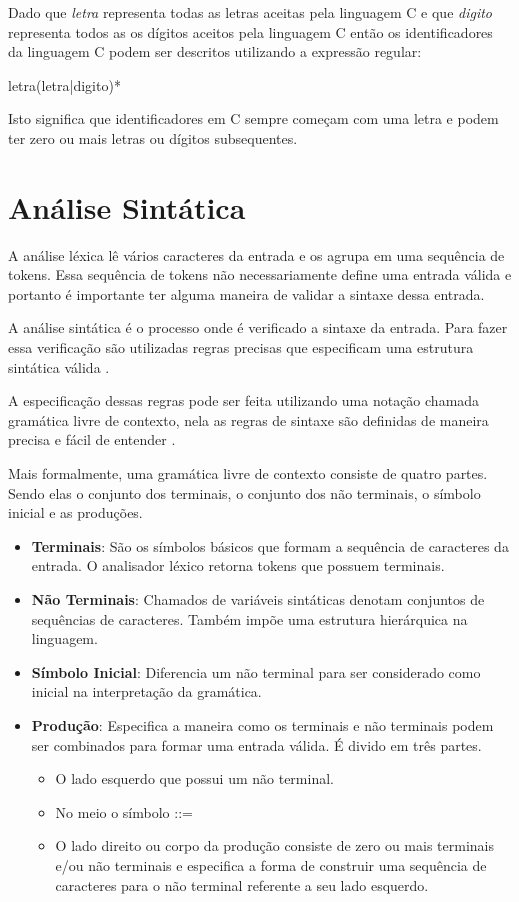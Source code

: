 Dado que \textit{letra} representa todas as letras aceitas pela linguagem C e
que \textit{digito} representa todos as os dígitos aceitos pela linguagem C então
os identificadores da linguagem C podem ser descritos utilizando a expressão regular:

\begin{center}
letra(letra|digito)*
\end{center}

Isto significa que identificadores em C sempre começam com uma letra e podem ter zero ou mais letras ou dígitos
subsequentes.

\section{Análise Sintática}
\label{sec:sintatic}

A análise léxica lê vários caracteres da entrada e os agrupa em uma sequência de tokens. Essa sequência de
tokens não necessariamente define uma entrada válida e portanto é importante ter alguma maneira de
validar a sintaxe dessa entrada.

A análise sintática é o processo onde é verificado a sintaxe da entrada. 
Para fazer essa verificação são utilizadas regras precisas que especificam 
uma estrutura sintática válida \cite{aho2006}.

A especificação dessas regras pode ser feita utilizando uma notação chamada gramática 
livre de contexto, nela as regras de sintaxe são definidas de 
maneira precisa e fácil de entender \cite{aho2006}.

Mais formalmente, uma gramática livre de contexto consiste de quatro partes. Sendo elas
o conjunto dos terminais, o conjunto dos não terminais, o símbolo inicial e as produções.

\begin{itemize}
    \item \textbf{Terminais}: São os símbolos básicos que formam a sequência de caracteres da entrada. O analisador léxico retorna tokens que possuem
    terminais. 
    \item \textbf{Não Terminais}: Chamados de variáveis sintáticas denotam conjuntos de sequências de caracteres. Também impõe 
    uma estrutura hierárquica na linguagem.
    \item \textbf{Símbolo Inicial}: Diferencia um não terminal para ser considerado como inicial na interpretação da gramática.
    \item \textbf{Produção}: Especifica a maneira como os terminais e não terminais podem ser combinados para formar uma entrada válida. É divido
    em três partes.
    \begin{itemize}
        \item O lado esquerdo que possui um não terminal.
        \item No meio o símbolo ::=
        \item O lado direito ou corpo da produção consiste de zero ou mais terminais e/ou não terminais e especifica
        a forma de construir uma sequência de caracteres para o não terminal referente a seu lado esquerdo.
    \end{itemize}
\end{itemize}

